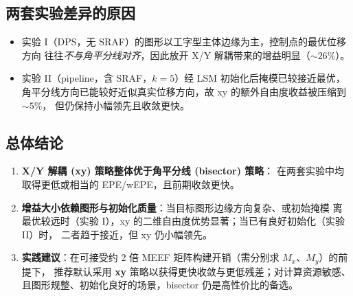 \documentclass[11pt]{article}
\begin{document}
\subsection{两套实验差异的原因}
\begin{itemize}
  \item 实验 I（DPS，无 SRAF）的图形以工字型主体边缘为主，控制点的最优位移方向
        往往\emph{不与角平分线对齐}，因此放开 X/Y 解耦带来的增益明显（$\sim26\%$）。
  \item 实验 II（pipeline，含 SRAF，$k=5$）经 LSM 初始化后掩模已较接近最优，
        角平分线方向已能较好近似真实位移方向，故 xy 的额外自由度收益被压缩到 $\sim5\%$，
        但仍保持小幅领先且收敛更快。
\end{itemize}

\subsection{总体结论}
\begin{enumerate}
  \item \textbf{X/Y 解耦 (xy) 策略整体优于角平分线 (bisector) 策略}：
        在两套实验中均取得更低或相当的 EPE/wEPE，且前期收敛更快。
  \item \textbf{增益大小依赖图形与初始化质量}：当目标图形边缘方向复杂、或初始掩模
        离最优较远时（实验 I），xy 的二维自由度优势显著；当已有良好初始化（实验 II）时，
        二者趋于接近，但 xy 仍小幅领先。
  \item \textbf{实践建议}：在可接受约 2 倍 MEEF 矩阵构建开销（需分别求 $M_x$、$M_y$）的前提下，
        推荐默认采用 \textbf{xy} 策略以获得更快收敛与更低残差；对计算资源敏感、
        且图形规整、初始化良好的场景，bisector 仍是高性价比的备选。
\end{enumerate}
\end{document}
